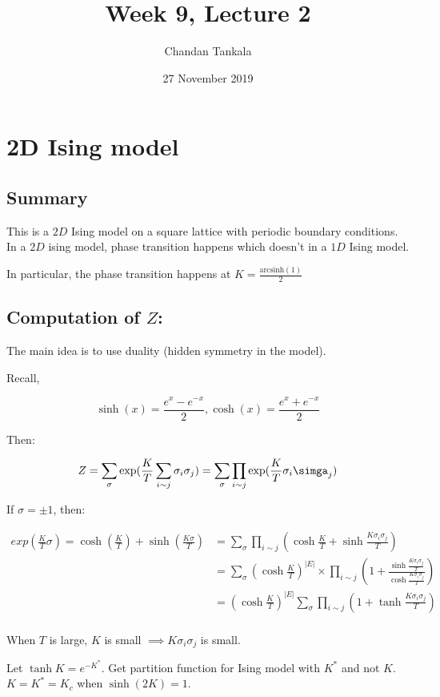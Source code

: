 \documentclass{article}
\title{Week 9, Lecture 2}
\author{Chandan Tankala}
\date{27 November 2019}
\begin{document}
\maketitle
\section{2D Ising model}
\subsection{Summary}

This is a $2D$ Ising model on a square lattice with periodic boundary conditions. In a $2D$ ising model, phase transition happens which doesn't in a $1D$ Ising model. 

In particular, the phase transition happens at $K = \frac{\text{arcsinh} (1)}{2}$\\

\subsection{Computation of $Z$:}
The main idea is to use duality (hidden symmetry in the model).

Recall,

$$\sinh(x) = \frac{e^x-e^{-x}}{2}, \cosh(x) = \frac{e^x+e^{-x}}{2}$$

Then:

$$Z = \sum_{\sigma}\exp(\frac{K}{T}\sum_{i\sim j}\sigma_i\sigma_j) = \sum_{\sigma}\prod_{i\sim j}\exp(\frac{K}{T}\sigma_i\simga_j)$$

If $\sigma = \pm 1$, then:

$$
\begin{align}
exp\left( \frac{K}{T}\sigma \right) = \cosh \left( \frac{K}{T} \right)+\sinh \left( \frac{K\sigma}{T} \right) &= \sum_{\sigma}\prod_{i\sim j} \left( \cosh \frac{K}{T} + \sinh \frac{K\sigma_i\sigma_j}{T}  \right) \\
&= \sum_{\sigma} \left(\cosh \frac{K}{T} \right)^{|E|}\times \prod_{i\sim j}\left( 1+\frac{\sinh \frac{K\sigma_i\sigma_j}{T}}{\cosh \frac{K\sigma_i\sigma_j}{T}} \right)\\
&= \left( \cosh \frac{K}{T} \right)^{|E|} \sum_{\sigma}\prod_{i\sim j} \left( 1+\tanh \frac{K\sigma_i \sigma_j}{T} \right)\\
\end{align}
$$

When $T$ is large, $K$ is small $\implies K\sigma_i\sigma_j$ is small.

Let $\tanh K = e^{-K^{*}}$. Get partition function for Ising model with $K^{*}$ and not $K$. $K=K^{*}=K_c$ when $\sinh (2K) = 1$.
\end{document}
